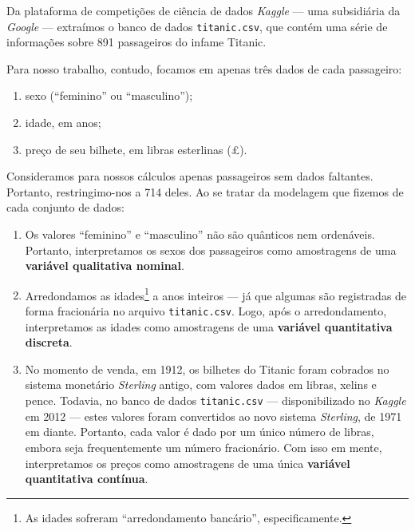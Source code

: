\documentclass[brazil, a4paper, 11pt]{article}
\begin{document}
	

	\noindent
	Da plataforma de competições de ciência de dados \textit{Kaggle} --- uma subsidiária da \textit{Google} --- extraímos o banco de dados \verb|titanic.csv|, que contém uma série de informações sobre 891 passageiros do infame Titanic.

	Para nosso trabalho, contudo, focamos em apenas três dados de cada passageiro:
	\begin{enumerate}
		\item sexo (``feminino'' ou ``masculino'');
		
		\item idade, em anos;

		\item preço de seu bilhete, em libras esterlinas (\pounds).
	\end{enumerate}
	Consideramos para nossos cálculos apenas passageiros sem dados faltantes. Portanto, restringimo-nos a 714 deles.
	Ao se tratar da modelagem que fizemos de cada conjunto de dados:
	\begin{enumerate}
		\item Os valores ``feminino'' e ``masculino'' não são quânticos nem ordenáveis. Portanto, interpretamos os sexos dos passageiros como amostragens de uma \textbf{variável qualitativa nominal}.

		\item Arredondamos as idades\footnote{As idades sofreram ``arredondamento bancário'', especificamente.} a anos inteiros --- já que algumas são registradas de forma fracionária no arquivo \verb|titanic.csv|. Logo, após o arredondamento, interpretamos as idades como amostragens de uma \textbf{variável quantitativa discreta}.

		\item No momento de venda, em 1912, os bilhetes do Titanic foram cobrados no sistema monetário \textit{Sterling} antigo, com valores dados em libras, xelins e pence. Todavia, no banco de dados \verb|titanic.csv| --- disponibilizado no \emph{Kaggle} em 2012 --- estes valores foram convertidos ao novo sistema \textit{Sterling}, de 1971 em diante. Portanto, cada valor é dado por um único número de libras, embora seja frequentemente um número fracionário. Com isso em mente, interpretamos os preços como amostragens de uma única \textbf{variável quantitativa contínua}.
	\end{enumerate}
	\vspace*{\baselineskip}
	
\end{document}
